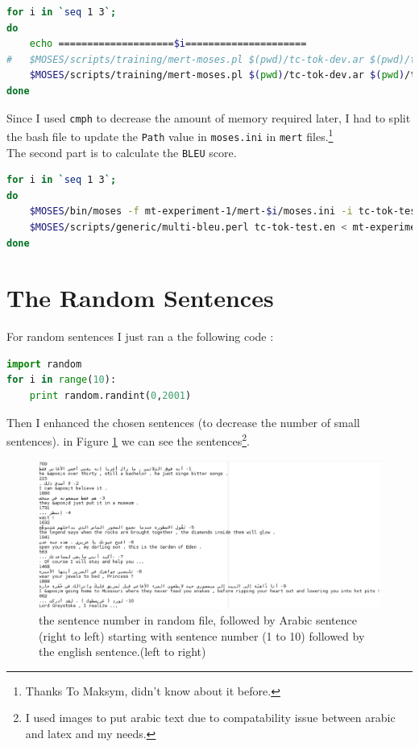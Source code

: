 \documentclass{article}
\begin{document}
\begin{lstlisting}[language=bash]
for i in `seq 1 3`;
do	
	echo ====================$i=====================
#	$MOSES/scripts/training/mert-moses.pl $(pwd)/tc-tok-dev.ar $(pwd)/tc-tok-dev.en $MOSES/bin/moses train/model/moses.ini --mertdir $MOSES/bin/ --decoder-flags="-threads all" &> mert$i.out 
	$MOSES/scripts/training/mert-moses.pl $(pwd)/tc-tok-dev.ar $(pwd)/tc-tok-dev.en $MOSES/bin/moses $(pwd)/mt-experiment-1/model/moses.ini  --working-dir  $(pwd)/mt-experiment-1/mert-$i --threads 4 --decoder-flags "--threads 4" > mert-$i.out
done
\end{lstlisting}
Since I used \texttt{cmph} to decrease the amount of memory required later, I had to split the bash file to update the \texttt{Path} value in \texttt{moses.ini} in \texttt{mert} files.\footnote{Thanks To Maksym, didn't know about it before.}\\
The second part is to calculate the \texttt{BLEU} score.
\begin{lstlisting}[language=bash]
for i in `seq 1 3`;
do	
	$MOSES/bin/moses -f mt-experiment-1/mert-$i/moses.ini -i tc-tok-test.ar > mt-experiment-1/mert-$i/hypothesis0.ar
	$MOSES/scripts/generic/multi-bleu.perl tc-tok-test.en < mt-experiment-1/mert-$i/hypothesis0.ar > out_$i.txt
done
\end{lstlisting}
\section{The Random Sentences}
For random sentences I just ran a the following code : 
\begin{lstlisting}[language=python]
import random
for i in range(10):
	print random.randint(0,2001)
\end{lstlisting} 
Then I enhanced the chosen sentences (to decrease the number of small sentences).
in Figure \ref{fig:1} we can see the sentences\footnote{I used images to put arabic text due to compatability issue between arabic and latex and my needs.}.
\begin{figure}[H]
\includegraphics[scale=0.5]{randomtest.png}
\caption{the sentence number in random file, followed by Arabic sentence (right to left) starting with sentence number (1 to 10) followed by the english sentence.(left to right)\label{fig:1}}
\end{figure}
\end{document}
